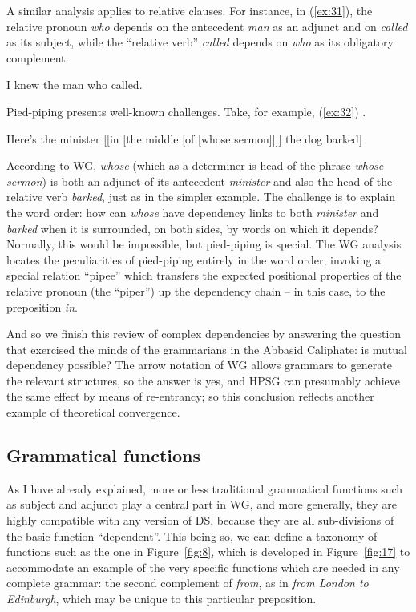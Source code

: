 \documentclass[output=paper
 	        ,biblatex
                ,babelshorthands
                ,newtxmath
                ,draftmode
                ,colorlinks, citecolor=brown
]{langscibook}
\begin{document}
A similar analysis applies to relative clauses. For instance, in (\ref{ex:31}), the relative pronoun \emph{who} depends on the antecedent \emph{man} as an adjunct and on \emph{called} as its subject, while the ``relative verb'' \emph{called} depends on \emph{who} as its obligatory complement.

\begin{exe}
	\ex \label{ex:31} I knew the man who called.
\end{exe}

Pied-piping presents well-known challenges. Take, for example, (\ref{ex:32}) \citep[212]{ps2}.

\begin{exe}
	\ex \label{ex:32} Here’s the minister [[in [the middle [of [whose sermon]]]] the dog barked]
\end{exe}

According to WG, \emph{whose} (which as a determiner is head of the phrase \emph{whose sermon}) is both an adjunct of its antecedent \emph{minister} and also the head of the relative verb \emph{barked}, just as in the simpler example. The challenge is to explain the word order: how can \emph{whose} have dependency links to both \emph{minister} and \emph{barked} when it is surrounded, on both sides, by words on which it depends? Normally, this would be impossible, but pied-piping is special. The WG analysis \citep{Hudson2018a} locates the peculiarities of pied-piping entirely in the word order, invoking a special relation ``pipee'' which transfers the expected positional properties of the relative pronoun (the ``piper'') up the dependency chain – in this case, to the preposition \emph{in}.

And so we finish this review of complex dependencies by answering the question that exercised the minds of the  grammarians in the Abbasid Ca\-liph\-ate: is mutual dependency possible? The arrow notation of WG allows grammars to generate the relevant structures, so the answer is yes, and HPSG can presumably achieve the same effect by means of re-entrancy; so this conclusion reflects another example of theoretical convergence.


\subsection{Grammatical functions}
\label{sec:5.3}

As I have already explained, more or less traditional grammatical functions such as subject and adjunct play a central part in WG, and more generally, they are highly compatible with any version of DS, because they are all sub-divisions of the basic function ``dependent''. This being so, we can define a taxonomy of functions such as the one in Figure~\ref{fig:8}, which is developed in Figure~\ref{fig:17} to accommodate an example of the very specific functions which are needed in any complete grammar: the second complement of \emph{from}, as in \emph{from London to Edinburgh}, which may be unique to this particular preposition.
\end{document}
